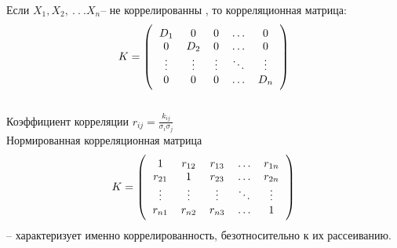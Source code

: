 \documentclass[russian, 12pt, fleqn,x11names]{article}
\begin{document}
Если $X_1, X_2, \ .\ .\ . X_n$-- не коррелированны , то корреляционная матрица:\\
$$
K=\left(\begin{tabular}{c c c c c}
\(D_1\) & \(0\) & \(0\) & \(\ldots\) & \(0\) \\
\(0\) &\( D_2\) & \(0\) & \(\ldots\) &\( 0\)\\
\(\vdots\) & \(\vdots\) & \(\vdots\) & \(\ddots\) & \(\vdots\) \\
\(0\)& \(0\) &\(0\) & \(\ldots\) & \(D_n\)\\	
\end{tabular}\right)$$\\
Коэффициент корреляции $r_{ij} = \frac{k_{ij}}{\sigma_i \sigma_j}$\\
Нормированная корреляционная матрица
$$
K=\left(\begin{tabular}{c c c c c}
\(1\) & \(r_{12}\) & \(r_{13}\) & \(\ldots\) & \(r_{1n}\) \\
\(r_{21}\) &\(1\) & \(r_{23}\) & \(\ldots\) &\( r_{2n}\)\\
\(\vdots\) & \(\vdots\) & \(\vdots\) & \(\ddots\) & \(\vdots\) \\
\(r_{n1}\)& \(r_{n2}\) &\( r_{n3}\) & \(\ldots\) & \(1\)\\
\end{tabular}\right)$$
-- характеризует именно коррелированность, безотносительно  к их рассеиванию.



\end{document}
